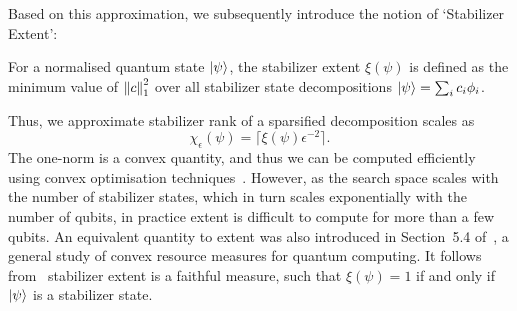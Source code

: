 Based on this approximation, we subsequently introduce the notion of `Stabilizer Extent':
\begin{defn}
For a normalised quantum state $\ket{\psi}$, the stabilizer extent $\xi\left(\psi\right)$ is defined as the minimum value of $\norm{c}^{2}_{1}$ over all stabilizer state decompositions $\ket{\psi}=\sum_{i}c_{i}\phi_{i}$.
\end{defn}
Thus, we approximate stabilizer rank of a sparsified decomposition scales as
\begin{equation}
\chi_{\epsilon}\left(\psi\right)=\lceil \xi\left(\psi\right)\epsilon^{-2}\rceil.
\label{eq:extent_srank}
\end{equation}
The one-norm is a convex quantity, and thus we can be computed efficiently using convex optimisation techniques~\cite{Boyd2004}. However, as the search space scales with the number of stabilizer states, which in turn scales exponentially with the number of qubits, in practice extent is difficult to compute for more than a few qubits. An equivalent quantity to extent was also introduced in Section~5.4 of~\cite{Regula2018}, a general study of convex resource measures for quantum computing. It follows from~\cite{Regula2018} stabilizer extent is a faithful measure, such that $\xi\left(\psi\right)=1$ if and only if $\ket{\psi}$ is a stabilizer state.
